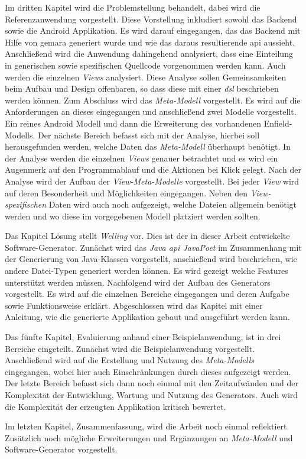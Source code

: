 Im dritten Kapitel wird die Problemstellung behandelt, dabei wird die Referenzanwendung vorgestellt. Diese Vorstellung inkludiert sowohl das Backend sowie die Android Applikation. Es wird darauf eingegangen, das das Backend mit Hilfe von \ac{gemara} generiert wurde und wie das daraus resultierende \acl{api} aussieht. Anschließend wird die Anwendung dahingehend analysiert, dass eine Einteilung in generischen sowie spezifischen Quellcode vorgenommen werden kann. Auch werden die einzelnen \textit{Views} analysiert. Diese Analyse sollen Gemeinsamkeiten beim Aufbau und Design offenbaren, so dass diese mit einer \textit{\ac{dsl}} beschrieben werden können. Zum Abschluss wird das \textit{Meta-Modell} vorgestellt. Es wird auf die Anforderungen an dieses eingegangen und anschließend zwei Modelle vorgestellt. Ein reines Android Modell und dann die Erweiterung des vorhandenen Enfield-Modells. Der nächste Bereich befasst sich mit der Analyse, hierbei soll herausgefunden werden, welche Daten das \textit{Meta-Modell} überhaupt benötigt. In der Analyse werden die einzelnen \textit{Views} genauer betrachtet und es wird ein Augenmerk auf den Programmablauf und die Aktionen bei Klick gelegt. Nach der Analyse wird der Aufbau der \textit{View-Meta-Modelle} vorgestellt. Bei jeder \textit{View} wird auf deren Besonderheit und Möglichkeiten eingegangen. Neben den \textit{View-spezifischen} Daten wird auch noch aufgezeigt, welche Dateien allgemein benötigt werden und wo diese im vorgegebenen Modell platziert werden sollten. 

Das Kapitel Lösung stellt \textit{Welling} vor. Dies ist der in dieser Arbeit entwickelte Software-Generator. Zunächst wird das \textit{Java \acf{api} JavaPoet} im Zusammenhang mit der Generierung von Java-Klassen vorgestellt, anschießend wird beschrieben, wie andere Datei-Typen generiert werden können. Es wird gezeigt welche Features unterstützt werden müssen. Nachfolgend wird der Aufbau des Generators vorgestellt. Es wird auf die einzelnen Bereiche eingegangen und deren Aufgabe sowie Funktionsweise erklärt. Abgeschlossen wird das Kapitel mit einer Anleitung, wie die generierte Applikation gebaut und ausgeführt werden kann.

Das fünfte Kapitel, Evaluierung anhand einer Beispielanwendung, ist in drei Bereiche eingeteilt. Zunächst wird die Beispielanwendung vorgestellt. Anschließend wird auf die Erstellung und Nutzung des \textit{Meta-Modells} eingegangen, wobei hier auch Einschränkungen durch dieses aufgezeigt werden. Der letzte Bereich befasst sich dann noch einmal mit den Zeitaufwänden und der Komplexität der Entwicklung, Wartung und Nutzung des Generators. Auch wird die Komplexität der erzeugten Applikation kritisch bewertet.

Im letzten Kapitel, Zusammenfassung, wird die Arbeit noch einmal reflektiert. Zusätzlich noch mögliche Erweiterungen und Ergänzungen an \textit{Meta-Modell} und Software-Generator vorgestellt.
